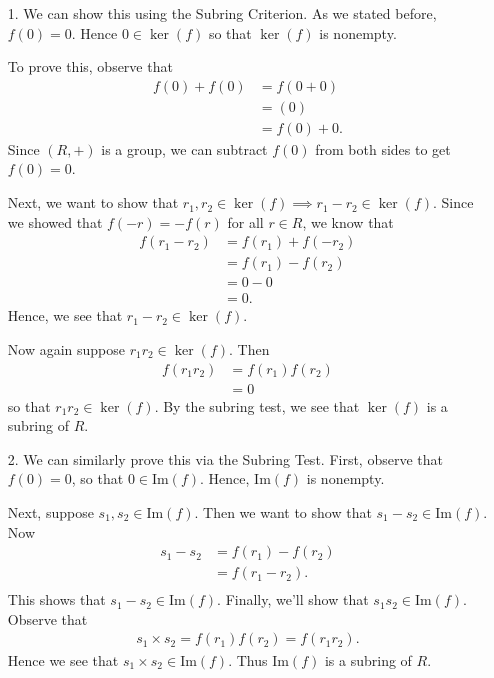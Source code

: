 \documentclass[12pt,letterpaper]{algebra_book}
\newcommand{\im}{\mbox{Im}}
\theoremstyle{definition}
\begin{document}
    \begin{prf}
        \begin{itemize}
            \item[1.] We can show this using the Subring Criterion.
            As we stated before, $f(0) = 0$. Hence $0 \in
            \ker(f)$ so that $\ker(f)$ is nonempty. 

            To prove this, observe that 
            \begin{align*}
                f(0) + f(0) & = f(0 + 0)\\
                & = (0)\\
                & = f(0) + 0.
            \end{align*}
            Since $(R, +)$ is a group, we can subtract $f(0)$
            from both sides to get $f(0) = 0$.

            Next, we want to show that $r_1, r_2 \in \ker(f)
            \implies r_1 - r_2 \in \ker(f)$. Since we showed that
            $f(-r) = -f(r)$ for all $r \in R$, we know that 
            \begin{align*}
                f(r_1 - r_2) & = f(r_1) + f(-r_2)\\
                & = f(r_1) - f(r_2)\\
                & = 0 - 0\\
                & = 0.
            \end{align*}
            Hence, we see that $r_1 - r_2 \in \ker(f)$. 

            Now again suppose $r_1r_2 \in \ker(f)$. Then 
            \begin{align*}
                f(r_1r_2) & = f(r_1)f(r_2)\\
                & = 0
            \end{align*}
            so that $r_1r_2 \in \ker(f)$. By the subring test, we
            see that $\ker(f)$ is a subring of $R$. 

            \item[2.] We can similarly prove this via the Subring
            Test. First, observe that $f(0) = 0$, so that $0 \in
            \im(f)$. Hence, $\im(f)$ is nonempty. 

            Next, suppose $s_1, s_2 \in \im(f)$. Then we want to
            show that $s_1 - s_2 \in \im(f)$. Now 
            \begin{align*}
                s_1 - s_2 & = f(r_1) - f(r_2)\\
                & =f(r_1 - r_2).\\
            \end{align*}
            This shows that $s_1 - s_2 \in \im(f)$. Finally, we'll
            show that $s_1s_2 \in \im(f)$. Observe that 
            \begin{align*}
                s_1 \times s_2 = f(r_1)f(r_2) = f(r_1r_2).
            \end{align*}
            Hence we see that $s_1\times s_2 \in \im(f)$. Thus
            $\im(f)$ is a subring of $R$. 
        \end{itemize}            
    \end{prf}
\end{document}
